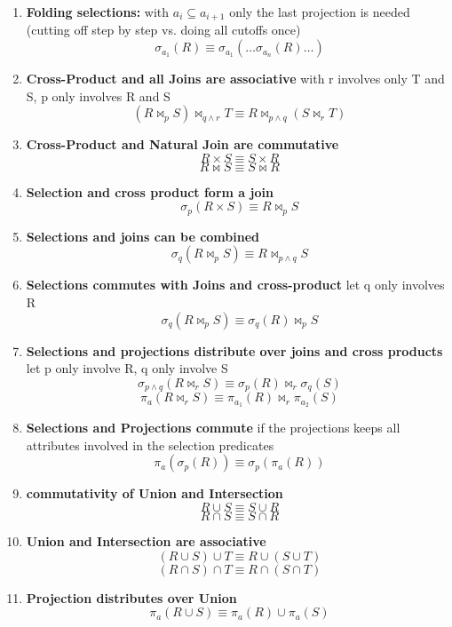 \documentclass[a4paper]{article}
\begin{document}
\begin{twocolumn}
\begin{enumerate}
	\item \textbf{Folding selections:} with $a_i \subseteq a_{i+1}$ only the last projection is needed (cutting off step by step vs. doing all cutoffs once)
	\[ \sigma_{a_1}(R) \equiv \sigma_{a_1}(\dots \sigma_{a_n}(R) \dots) \]
	
	\item \textbf{Cross-Product and all Joins are associative} with r involves only T and S, p only involves R and S
	\[ (R \bowtie_p S) \bowtie_{q \wedge r} T \equiv R \bowtie_{p \wedge q} (S \bowtie_r T) \]
	
	\item \textbf{Cross-Product and Natural Join are commutative}
	\[ R \times S \equiv S \times R \]
	\[ R \bowtie S \equiv S \bowtie R \]
	
	\item \textbf{Selection and cross product form a join}
	\[ \sigma_p(R \times S) \equiv R \bowtie_p S \] 
	
	\item \textbf{Selections and joins can be combined}
	\[ \sigma_q(R \bowtie_p S) \equiv R \bowtie_{p \wedge q} S \] 
	
	\item \textbf{Selections commutes with Joins and cross-product} let q only involves R
	\[ \sigma_q(R \bowtie_p S) \equiv \sigma_q(R) \bowtie_{p} S \]     
	
	\item \textbf{Selections and projections distribute over joins and cross products} let p only involve R, q only involve S
	\[ \sigma_{p \wedge q}(R \bowtie_r S) \equiv \sigma_p(R) \bowtie_{r} \sigma_q(S) \] 
	\[ \pi_{a}(R \bowtie_r S) \equiv \pi_{a_1}(R) \bowtie_{r} \pi_{a_2}(S) \] 
	
	\item \textbf{Selections and Projections commute } if the projections keeps all attributes involved in the selection predicates
	\[ \pi_a(\sigma_p(R)) \equiv \sigma_p(\pi_a(R)) \] 
	
	\item \textbf{commutativity of Union and Intersection}
	\[ R \cup S \equiv S \cup R  \]
	\[ R \cap S \equiv S \cap R  \]
	
	\item \textbf{Union and Intersection are associative}
	\[ (R \cup S) \cup T \equiv R \cup (S \cup T) \]
	\[ (R \cap S) \cap T \equiv R \cap (S \cap T) \]
	
	\item \textbf{Projection distributes over Union}
	\[ \pi_{a}(R \cup S) \equiv \pi_{a}(R) \cup \pi_{a}(S) \] 
	

\end{enumerate}
\end{twocolumn}
\end{document}
